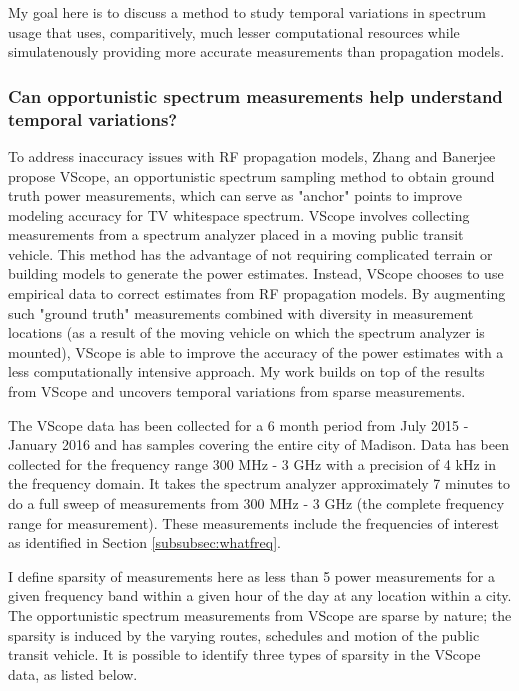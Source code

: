 My goal here is to discuss a method to study temporal variations in spectrum usage that uses, comparitively, much lesser computational resources while simulatenously providing more accurate measurements than propagation models.

\subsubsection{Can opportunistic spectrum measurements help understand temporal variations?}
To address inaccuracy issues with RF propagation models, Zhang and Banerjee \cite{ZhangThesis} \cite{VScope} \cite{VScope2} propose VScope, an opportunistic spectrum sampling method to obtain ground truth power measurements, which can serve as "anchor" points to improve modeling accuracy for TV whitespace spectrum.
 VScope involves collecting measurements from a spectrum analyzer placed in a moving public transit vehicle.
 This method has the advantage of not requiring complicated terrain or building models to generate the power estimates.
 Instead, VScope chooses to use empirical data to correct estimates from RF propagation models.
 By augmenting such "ground truth" measurements combined with diversity in measurement locations (as a result of the moving vehicle on which the spectrum analyzer is mounted), VScope is able to improve the accuracy of the power estimates with a less computationally intensive approach.
 My work builds on top of the results from VScope and uncovers temporal variations from sparse measurements.


The VScope data has been collected for a 6 month period from July 2015 - January 2016 and has samples covering the entire city of Madison.
 Data has been collected for the frequency range 300 MHz - 3 GHz with a precision of 4 kHz in the frequency domain.
 It takes the spectrum analyzer approximately 7 minutes to do a full sweep of measurements from 300 MHz - 3 GHz (the complete frequency range for measurement).
 These measurements include the frequencies of interest as identified in Section \ref{subsubsec:whatfreq}.

I define sparsity of measurements here as less than 5 power measurements for a given frequency band within a given hour of the day at any location within a city.
 The opportunistic spectrum measurements from VScope are sparse by nature; the sparsity is induced by the varying routes, schedules and motion of the public transit vehicle.
 It is possible to identify three types of sparsity in the VScope data, as listed below.

